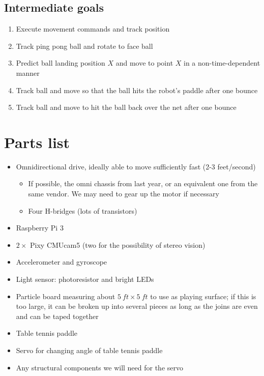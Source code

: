 \documentclass[letterpaper, 11pt]{article}
\begin{document}
\subsection*{Intermediate goals}
\begin{enumerate}
    \item Execute movement commands and track position
    \item Track ping pong ball and rotate to face ball
    \item Predict ball landing position $X$ and move to point $X$ in a non-time-dependent manner
    \item Track ball and move so that the ball hits the robot's paddle after one bounce
    \item Track ball and move to hit the ball back over the net after one bounce
\end{enumerate}

\section{Parts list}
\begin{itemize}
    \item Omnidirectional drive, ideally able to move sufficiently fast (2-3 feet/second)
        \begin{itemize}
            \item If possible, the omni chassis from last year, or an equivalent one from the same vendor. We may need to gear up the motor if necessary
            \item Four H-bridges (lots of transistors)
        \end{itemize}
    \item Raspberry Pi 3
    \item $2\times{}$ Pixy CMUcam5 (two for the possibility of stereo vision)
    \item Accelerometer and gyroscope %
    \item Light sensor: photoresistor and bright LEDs %
    \item Particle board measuring about $\SI{5}{ft}\times\SI{5}{ft}$ to use as playing surface; if this is too large, it can be broken up into several pieces as long as the joins are even and can be taped together
    \item Table tennis paddle
    \item Servo for changing angle of table tennis paddle %
    \item Any structural components we will need for the servo %
\end{itemize}
\end{document}
